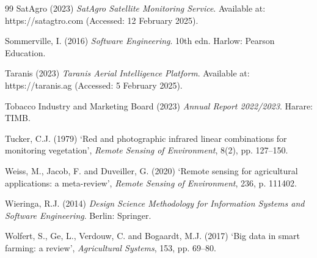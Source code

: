 \documentclass[12pt,a4paper]{report}
\begin{document}
\begin{thebibliography}{99}
SatAgro (2023) \textit{SatAgro Satellite Monitoring Service}. Available at: https://satagtro.com (Accessed: 12 February 2025).

Sommerville, I. (2016) \textit{Software Engineering}. 10th edn. Harlow: Pearson Education.

Taranis (2023) \textit{Taranis Aerial Intelligence Platform}. Available at: https://taranis.ag (Accessed: 5 February 2025).

Tobacco Industry and Marketing Board (2023) \textit{Annual Report 2022/2023}. Harare: TIMB.

Tucker, C.J. (1979) `Red and photographic infrared linear combinations for monitoring vegetation', \textit{Remote Sensing of Environment}, 8(2), pp. 127--150.

Weiss, M., Jacob, F. and Duveiller, G. (2020) `Remote sensing for agricultural applications: a meta-review', \textit{Remote Sensing of Environment}, 236, p. 111402.

Wieringa, R.J. (2014) \textit{Design Science Methodology for Information Systems and Software Engineering}. Berlin: Springer.

Wolfert, S., Ge, L., Verdouw, C. and Bogaardt, M.J. (2017) `Big data in smart farming: a review', \textit{Agricultural Systems}, 153, pp. 69--80.

\end{thebibliography}
\end{document}
